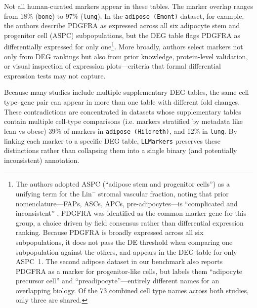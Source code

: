 \documentclass[10pt,twocolumn]{article}
\theoremstyle{plain}
\theoremstyle{definition}
\theoremstyle{remark}
\begin{document}
 Not all human-curated markers appear in these tables. The marker overlap ranges from 18\% (\texttt{bone}) to 97\% (\texttt{lung}). In the \texttt{adipose (Emont)} dataset, for example, the authors describe PDGFRA as expressed across all six adipocyte stem and progenitor cell (ASPC) subpopulations, but the DEG table flags PDGFRA as differentially expressed for only one\footnote{The authors adopted ASPC (``adipose stem and progenitor cells'') as a unifying term for the Lin$^-$ stromal vascular fraction, noting that prior nomenclature---FAPs, ASCs, APCs, pre-adipocytes---is ``complicated and inconsistent'' \citep{Emont2022}. PDGFRA was identified as the common marker gene for this group, a choice driven by field consensus rather than differential expression ranking. Because PDGFRA is broadly expressed across all six subpopulations, it does not pass the DE threshold when comparing one subpopulation against the others, and appears in the DEG table for only ASPC~1. The second adipose dataset in our benchmark \citep{Hildreth2021} also reports PDGFRA as a marker for progenitor-like cells, but labels them ``adipocyte precursor cell'' and ``preadipocyte''---entirely different names for an overlapping biology. Of the 73 combined cell type names across both studies, only three are shared.}. More broadly, authors select markers not only from DEG rankings but also from prior knowledge, protein-level validation, or visual inspection of expression plots---criteria that formal differential expression tests may not capture. 

Because many studies include multiple supplementary DEG tables, the same cell type--gene pair can appear in more than one table with different fold changes.  These contradictions are concentrated in datasets whose supplementary tables contain multiple cell-type comparisons (i.e. markers stratified by metadata like lean vs obese) 39\% of markers in \texttt{adipose (Hildreth)}, and 12\% in \texttt{lung}. By linking each marker to a specific DEG table, \texttt{LLMarkers} preserves these distinctions rather than collapsing them into a single binary (and potentially inconsistent) annotation.
\end{document}
